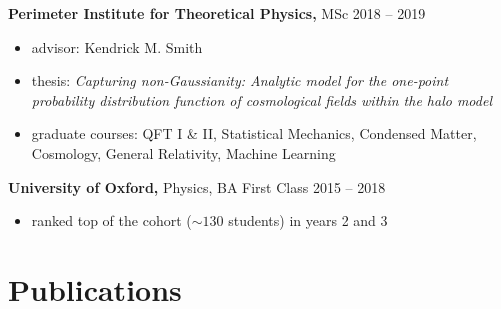 \documentclass[margin]{res}
\begin{document}
\begin{resume}
	{\bf Perimeter Institute for Theoretical Physics,} MSc \hfill 2018 -- 2019
	\begin{itemize} \itemsep -2pt
		\item advisor: Kendrick M. Smith
		\item thesis: \emph{Capturing non-Gaussianity: Analytic model for the one-point
		probability distribution function of cosmological fields within the halo model}
		\item graduate courses: QFT I \& II, Statistical Mechanics, Condensed Matter,
		Cosmology, General Relativity, Machine Learning
	\end{itemize}

	{\bf University of Oxford,} Physics, BA First Class \hfill 2015 -- 2018
	\begin{itemize} \itemsep -2pt
		\item ranked top of the cohort ($\sim 130$ students) in years 2 and 3
	\end{itemize}

\section{Publications}



\end{resume}
\end{document}
